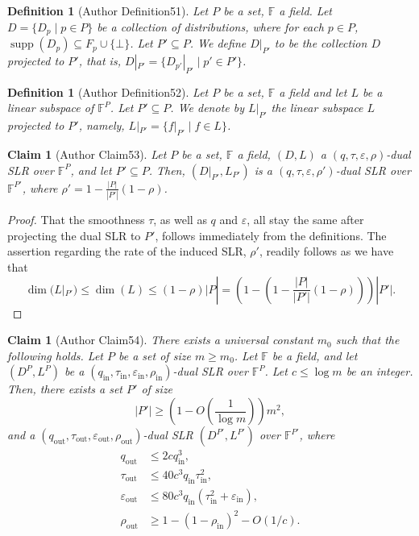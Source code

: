 \documentclass[10pt,a4paper]{article}
\newtheorem{ntdefinition}[nttheorem]{Definition}
\newtheorem{ntclaim}[nttheorem]{Claim}
\begin{document}
\begin{ntdefinition}[Author Definition51]
Let $P$ be a set, $\mathbb F$ a field. Let $D=\{D_p\mid p\in P\}$ be a collection of distributions, where for each $p\in P$, $\operatorname{supp}(D_p)\subseteq F_p\cup\{\bot\}$. Let $P'\subseteq P$. We define $D|_{P'}$ to be the collection $D$ projected to $P'$, that is, $D|_{P'}=\{D_{p'}|_{P'}\mid p'\in P'\}$.
\end{ntdefinition}
\begin{ntdefinition}[Author Definition52]
Let $P$ be a set, $\mathbb F$ a field and let $L$ be a linear subspace of $\mathbb F^P$. Let $P'\subseteq P$. We denote by $L|_{P'}$ the linear subspace $L$ projected to $P'$, namely, $L|_{P'}=\{f|_{P'}\mid f\in L\}$.
\end{ntdefinition}
\begin{ntclaim}[Author Claim53]
Let $P$ be a set, $\mathbb F$ a field, $(D,L)$ a $(q,\tau,\varepsilon,\rho)$-dual SLR over $\mathbb F^P$, and let $P'\subseteq P$. Then, $(D|_{P'},L_{P'})$ is a $(q,\tau,\varepsilon,\rho')$-dual SLR over $\mathbb F^{P'}$, where $\rho'=1-\frac{|P|}{|P'|}(1-\rho)$.
\end{ntclaim}
\begin{proof}
That the smoothness $\tau$, as well as $q$ and $\varepsilon$, all stay the same after projecting the dual SLR to $P'$, follows immediately from the definitions. The assertion regarding the rate of the induced SLR, $\rho'$, readily follows as we have that
\[\dim(L|_{P'})\leq\dim(L)\leq(1-\rho)|P|=\left(1-\left(1-\frac{|P|}{|P'|}(1-\rho)\right)\right)|P'|.\]
\end{proof}
\begin{ntclaim}[Author Claim54]
There exists a universal constant $m_0$ such that the following holds. Let $P$ be a set of size $m\geq m_0$. Let $\mathbb F$ be a field, and let $(D^P,L^P)$ be a $(q_{\mathrm{in}},\tau_{\mathrm{in}},\varepsilon_{\mathrm{in}},\rho_{\mathrm{in}})$-dual SLR over $\mathbb F^P$. Let $c\leq\log m$ be an integer. Then, there exists a set $P'$ of size
\[|P'|\geq\left(1-O\left(\frac1{\log m}\right)\right)m^2,\]
and a $(q_{\mathrm{out}},\tau_{\mathrm{out}},\varepsilon_{\mathrm{out}},\rho_{\mathrm{out}})$-dual SLR $(D^{P'},L^{P'})$ over $\mathbb F^{P'}$, where
\begin{align*}q_{\mathrm{out}}&\leq2cq_{\mathrm{in}}^3,\\\tau_{\mathrm{out}}&\leq40c^3q_{\mathrm{in}}\tau_{\mathrm{in}}^2,\\\varepsilon_{\mathrm{out}}&\leq80c^3q_{\mathrm{in}}(\tau_{\mathrm{in}}^2+\varepsilon_{\mathrm{in}}),\\\rho_{\mathrm{out}}&\geq1-(1-\rho_{\mathrm{in}})^2-O(1/c).\end{align*}
\end{ntclaim}
\end{document}
